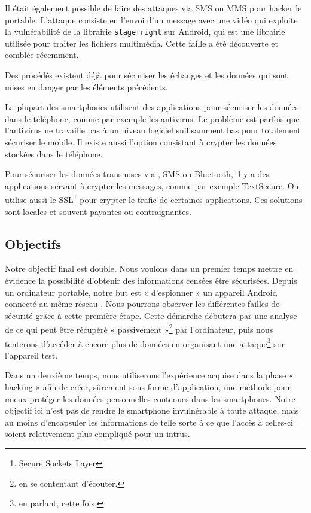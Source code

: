 \documentclass[a4paper, 12pt,twoside]{article}
\begin{document}
	Il était également possible de faire des attaques via SMS ou MMS pour hacker le portable. L'attaque consiste en l'envoi d'un message avec une vidéo qui exploite la vulnérabilité de la librairie \verb!stagefright! sur \newcommand{\Android}{Android} \Android{}, qui est une librairie utilisée pour traiter les fichiers multimédia. Cette faille a été découverte et comblée récemment.

	Des procédés existent déjà pour sécuriser les échanges et les données qui sont mises en danger par les éléments précédents.
	
	La plupart des smartphones utilisent des applications pour sécuriser les données dans le téléphone, comme par exemple les antivirus. Le problème est parfois que l'antivirus ne travaille pas à un niveau logiciel suffisamment bas pour totalement sécuriser le mobile. Il existe aussi l'option consistant à crypter les données stockées dans le téléphone.
	
	Pour sécuriser les données transmises via \wifi{}, SMS ou\newcommand{\bluetooth}{Bluetooth} \bluetooth{}, il y a des applications servant à crypter les messages, comme par exemple \href{http://www.whispersystems.org/#encrypted_texts}{TextSecure}. On utilise aussi le SSL\footnote{Secure Sockets Layer} pour crypter le trafic de certaines applications. Ces solutions sont locales et souvent payantes ou contraignantes.

	\subsection{Objectifs}
	
	Notre objectif final est double. Nous voulons dans un premier temps mettre en évidence la possibilité d'obtenir des informations censées être sécurisées. Depuis un ordinateur portable, notre but est « d'espionner » un appareil \Android{} connecté au même réseau \wifi{}. Nous pourrons observer les différentes failles de sécurité grâce à cette première étape. Cette démarche débutera par une analyse de ce qui peut être récupéré « passivement »\footnote{en se contentant d'écouter.} par l'ordinateur, puis nous tenterons d'accéder à encore plus de données en organisant une attaque\footnote{en parlant, cette fois.} sur l'appareil test.
		
	Dans un deuxième temps, nous utiliserons l'expérience acquise dans la phase « hacking » afin de créer, sûrement sous forme d'application, une méthode pour mieux protéger les données personnelles contenues dans les smartphones. Notre objectif ici n'est pas de rendre le smartphone invulnérable à toute attaque, mais au moins d'encapsuler les informations de telle sorte à ce que l'accès à celles-ci soient relativement plus compliqué pour un intrus.
\end{document}
